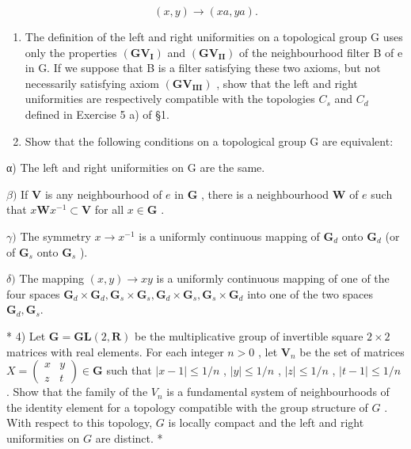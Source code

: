 \[
(x, y) \rightarrow (x a, y a).
\]

\begin{enumerate}
\def\labelenumi{\arabic{enumi})}
\setcounter{enumi}{1}
\item
  The definition of the left and right uniformities on a topological group G uses only the properties \((\mathbf{GV}_{\mathbf{I}})\) and \((\mathbf{GV}_{\mathbf{II}})\) of the neighbourhood filter B of e in G. If we suppose that B is a filter satisfying these two axioms, but not necessarily satisfying axiom \((\mathbf{GV}_{\mathbf{III}})\) , show that the left and right uniformities are respectively compatible with the topologies \(C_{s}\) and \(C_{d}\) defined in Exercise 5 a) of §1.
\item
  Show that the following conditions on a topological group G are equivalent:
\end{enumerate}

α) The left and right uniformities on G are the same.

\(\beta)\) If \(\mathbf{V}\) is any neighbourhood of \(e\) in \(\mathbf{G}\) , there is a neighbourhood \(\mathbf{W}\) of \(e\) such that \(x\mathbf{W}x^{-1} \subset \mathbf{V}\) for all \(x \in \mathbf{G}\) .

\(\gamma)\) The symmetry \(x \to x^{-1}\) is a uniformly continuous mapping of \(\mathbf{G}_d\) onto \(\mathbf{G}_d\) (or of \(\mathbf{G}_s\) onto \(\mathbf{G}_s\) ).

\(\delta)\) The mapping \((x,y)\to xy\) is a uniformly continuous mapping of one of the four spaces \(\mathbf{G}_d\times \mathbf{G}_d,\mathbf{G}_s\times \mathbf{G}_s,\mathbf{G}_d\times \mathbf{G}_s,\mathbf{G}_s\times \mathbf{G}_d\) into one of the two spaces \(\mathbf{G}_d,\mathbf{G}_s.\)

* 4) Let \(\mathbf{G} = \mathbf{GL}(2, \mathbf{R})\) be the multiplicative group of invertible square \(2 \times 2\) matrices with real elements. For each integer \(n > 0\) , let \(\mathbf{V}_n\) be the set of matrices \(X = \begin{pmatrix} x & y \\ z & t \end{pmatrix} \in \mathbf{G}\) such that \(|x - 1| \leqslant 1/n\) , \(|y| \leqslant 1/n\) , \(|z| \leqslant 1/n\) , \(|t - 1| \leqslant 1/n\) . Show that the family of the \(V_n\) is a fundamental system of neighbourhoods of the identity element for a topology compatible with the group structure of \(G\) . With respect to this topology, \(G\) is locally compact and the left and right uniformities on \(G\) are distinct. *

